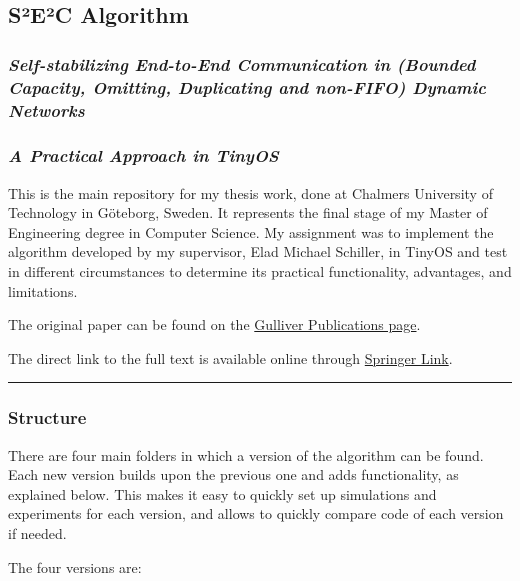 \subsection{S²E²C Algorithm}\label{sec-algorithm}

\subsubsection{\emph{Self-stabilizing End-to-End Communication in
(Bounded Capacity, Omitting, Duplicating and non-FIFO) Dynamic
Networks}}\label{self-stabilizing-end-to-end-communication-in-bounded-capacity-omitting-duplicating-and-non-fifo-dynamic-networks}

\subsubsection{\emph{A Practical Approach in
TinyOS}}\label{a-practical-approach-in-tinyos}

This is the main repository for my thesis work, done at Chalmers
University of Technology in Göteborg, Sweden. It represents the final
stage of my Master of Engineering degree in Computer Science. My
assignment was to implement the algorithm developed by my supervisor,
Elad Michael Schiller, in TinyOS and test in different circumstances to
determine its practical functionality, advantages, and limitations.

The original paper can be found on the
\href{http://www.chalmers.se/hosted/gulliver-en/documents/publications}{Gulliver
Publications page}.

The direct link to the full text is available online through
\href{http://link.springer.com/chapter/10.1007\%2F978-3-642-33536-5_14}{Springer
Link}.

\begin{center}\rule{3in}{0.4pt}\end{center}

\subsubsection{Structure}\label{structure}

There are four main folders in which a version of the algorithm can be
found. Each new version builds upon the previous one and adds
functionality, as explained below. This makes it easy to quickly set up
simulations and experiments for each version, and allows to quickly
compare code of each version if needed.

The four versions are:

